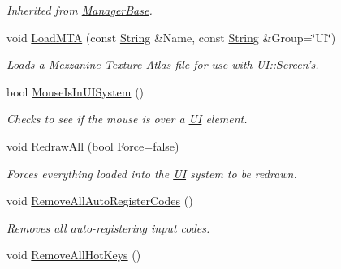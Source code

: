 \begin{DoxyCompactItemize}
\begin{DoxyCompactList}\small\item\em Inherited from \hyperlink{classMezzanine_1_1ManagerBase}{ManagerBase}. \item\end{DoxyCompactList}\item 
void \hyperlink{classMezzanine_1_1UIManager_a78c3b7a0aafc83e0b4ea55b0b0ad640c}{LoadMTA} (const \hyperlink{namespaceMezzanine_acf9fcc130e6ebf08e3d8491aebcf1c86}{String} \&Name, const \hyperlink{namespaceMezzanine_acf9fcc130e6ebf08e3d8491aebcf1c86}{String} \&Group=\char`\"{}UI\char`\"{})
\begin{DoxyCompactList}\small\item\em Loads a \hyperlink{namespaceMezzanine}{Mezzanine} Texture Atlas file for use with \hyperlink{classMezzanine_1_1UI_1_1Screen}{UI::Screen}'s. \item\end{DoxyCompactList}\item 
bool \hyperlink{classMezzanine_1_1UIManager_a7f3ea82551d2a894545235f4a9cba549}{MouseIsInUISystem} ()
\begin{DoxyCompactList}\small\item\em Checks to see if the mouse is over a \hyperlink{namespaceMezzanine_1_1UI}{UI} element. \item\end{DoxyCompactList}\item 
void \hyperlink{classMezzanine_1_1UIManager_a62fe2ec9d4dad13762aa154f65d707a7}{RedrawAll} (bool Force=false)
\begin{DoxyCompactList}\small\item\em Forces everything loaded into the \hyperlink{namespaceMezzanine_1_1UI}{UI} system to be redrawn. \item\end{DoxyCompactList}\item 
\hypertarget{classMezzanine_1_1UIManager_a294aa11be082a4d3130e7aedf34747c8}{
void \hyperlink{classMezzanine_1_1UIManager_a294aa11be082a4d3130e7aedf34747c8}{RemoveAllAutoRegisterCodes} ()}
\label{classMezzanine_1_1UIManager_a294aa11be082a4d3130e7aedf34747c8}

\begin{DoxyCompactList}\small\item\em Removes all auto-\/registering input codes. \item\end{DoxyCompactList}\item 
\hypertarget{classMezzanine_1_1UIManager_ae08dfa033157e91247ca95bae4d3fd7f}{
void \hyperlink{classMezzanine_1_1UIManager_ae08dfa033157e91247ca95bae4d3fd7f}{RemoveAllHotKeys} ()}
\label{classMezzanine_1_1UIManager_ae08dfa033157e91247ca95bae4d3fd7f}


\end{DoxyCompactItemize}
